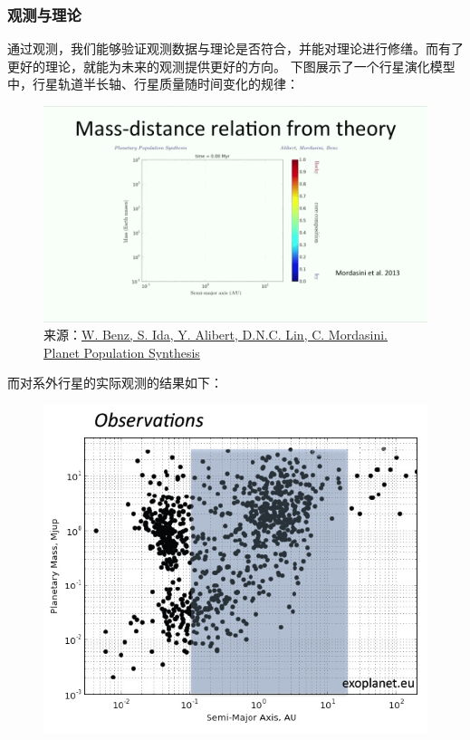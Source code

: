 \documentclass[letterpaper,10pt,english]{sphinxmanual}
\begin{document}
\subsubsection{观测与理论}
\label{statistics:id11}
通过观测，我们能够验证观测数据与理论是否符合，并能对理论进行修缮。而有了更好的理论，就能为未来的观测提供更好的方向。
下图展示了一个行星演化模型中，行星轨道半长轴、行星质量随时间变化的规律：
\begin{figure}[htbp]
\centering
\capstart

\includegraphics{Synthesis.gif}
\caption{来源：\href{http://arxiv.org/abs/1402.7086}{W. Benz, S. Ida, Y. Alibert, D.N.C. Lin, C. Mordasini. Planet Population Synthesis}}\end{figure}

而对系外行星的实际观测的结果如下：
\begin{figure}[htbp]
\centering

\includegraphics{observation.jpg}
\end{figure}
\end{document}
